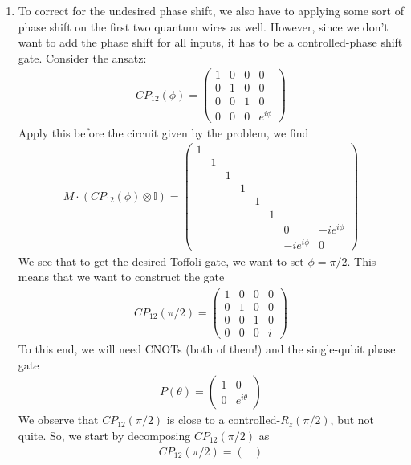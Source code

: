 \documentclass{article}
\theoremstyle{definition}
\begin{document}
\begin{enumerate}[label=(\alph*)]
	\item To correct for the undesired phase shift, we also have to applying some sort of phase shift on the first two quantum wires as well. However, since we don't want to add the phase shift for all inputs, it has to be a controlled-phase shift gate. Consider the ansatz:
	\begin{align*}
		CP_{12}(\phi) = \begin{pmatrix}
			1 &0&0&0\\
			0&1&0&0\\
			0&0&1&0\\
			0&0&0&e^{i\phi}
		\end{pmatrix}
	\end{align*}
	Apply this before the circuit given by the problem, we find 
	\begin{align*}
		M\cdot ( CP_{12}(\phi) \otimes \mathbb{I}) = \begin{pmatrix}
			1&&&&&&& \\
			&1&&&&&& \\
			&&1&&&&& \\
			&&&1&&&& \\
			&&&&1&&& \\
			&&&&&1&& \\
			&&&&&&0&-ie^{i\phi} \\
			&&&&&&-i e^{i\phi}&0 
		\end{pmatrix}
	\end{align*}
	We see that to get the desired Toffoli gate, we want to set $\phi = \pi/2$. This means that we want to construct the gate
	\begin{align*}
		CP_{12}(\pi/2) = \begin{pmatrix}
			1 &0&0&0\\
			0&1&0&0\\
			0&0&1&0\\
			0&0&0&i
		\end{pmatrix}
\end{align*}
To this end, we will need CNOTs (both of them!) and the single-qubit phase gate 
\begin{align*}
	P(\theta) = \begin{pmatrix}
		1 & 0 \\ 0 & e^{i\theta}
	\end{pmatrix}
\end{align*}
We observe that $CP_{12}(\pi/2)$ is close to a controlled-$R_z(\pi/2)$, but not quite.  So, we start by decomposing $CP_{12}(\pi/2)$ as 
\begin{align*}
	CP_{12}(\pi/2) = \begin{pmatrix}

\end{pmatrix}
\end{align*}
\end{enumerate}
\end{document}
